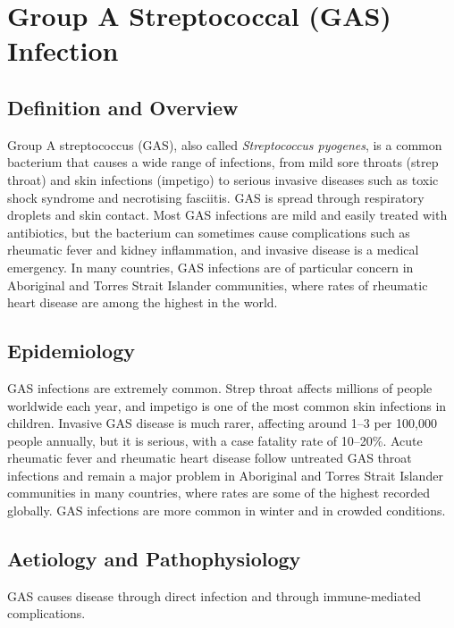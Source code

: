 \chapter{Group A Streptococcal (GAS) Infection}

\section*{Definition and Overview}
Group A streptococcus (GAS), also called \textit{Streptococcus pyogenes}, is a common bacterium that causes a wide range of infections, from mild sore throats (strep throat) and skin infections (impetigo) to serious invasive diseases such as toxic shock syndrome and necrotising fasciitis. GAS is spread through respiratory droplets and skin contact. Most GAS infections are mild and easily treated with antibiotics, but the bacterium can sometimes cause complications such as rheumatic fever and kidney inflammation, and invasive disease is a medical emergency. In many countries, GAS infections are of particular concern in Aboriginal and Torres Strait Islander communities, where rates of rheumatic heart disease are among the highest in the world.

\section*{Epidemiology}
GAS infections are extremely common. Strep throat affects millions of people worldwide each year, and impetigo is one of the most common skin infections in children. Invasive GAS disease is much rarer, affecting around 1--3 per 100,000 people annually, but it is serious, with a case fatality rate of 10--20\%. Acute rheumatic fever and rheumatic heart disease follow untreated GAS throat infections and remain a major problem in Aboriginal and Torres Strait Islander communities in many countries, where rates are some of the highest recorded globally. GAS infections are more common in winter and in crowded conditions.

\section*{Aetiology and Pathophysiology}
GAS causes disease through direct infection and through immune-mediated complications.


